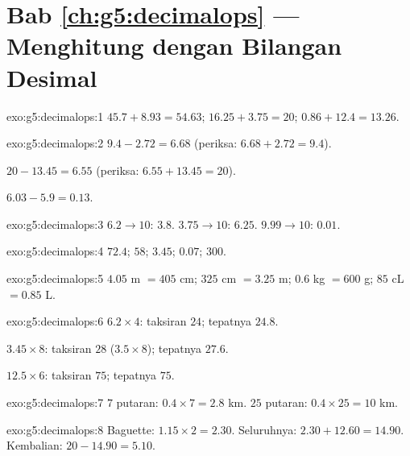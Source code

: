 \section*{Bab \ref{ch:g5:decimalops} --- Menghitung dengan Bilangan Desimal}

\begin{solution}{exo:g5:decimalops:1}
$45.7 + 8.93 = 54.63$; \quad
$16.25 + 3.75 = 20$; \quad
$0.86 + 12.4 = 13.26$.
\end{solution}

\begin{solution}{exo:g5:decimalops:2}
$9.4 - 2.72 = 6.68$ (periksa: $6.68 + 2.72 = 9.4$).

$20 - 13.45 = 6.55$ (periksa: $6.55 + 13.45 = 20$).

$6.03 - 5.9 = 0.13$.
\end{solution}

\begin{solution}{exo:g5:decimalops:3}
$6.2 \to 10$: $3.8$. \quad $3.75 \to 10$: $6.25$. \quad
$9.99 \to 10$: $0.01$.
\end{solution}

\begin{solution}{exo:g5:decimalops:4}
$72.4$; \quad $58$; \quad $3.45$; \quad $0.07$; \quad $300$.
\end{solution}

\begin{solution}{exo:g5:decimalops:5}
$4.05$ m $= 405$ cm; \quad $325$ cm $= 3.25$ m; \quad
$0.6$ kg $= 600$ g; \quad $85$ cL $= 0.85$ L.
\end{solution}

\begin{solution}{exo:g5:decimalops:6}
$6.2 \times 4$: taksiran $24$; tepatnya $24.8$.

$3.45 \times 8$: taksiran $28$ ($3.5 \times 8$); tepatnya $27.6$.

$12.5 \times 6$: taksiran $75$; tepatnya $75$.
\end{solution}

\begin{solution}{exo:g5:decimalops:7}
$7$ putaran: $0.4 \times 7 = 2.8$ km. $25$ putaran:
$0.4 \times 25 = 10$ km.
\end{solution}

\begin{solution}{exo:g5:decimalops:8}
Baguette: $1.15 \times 2 = 2.30$. Seluruhnya: $2.30 + 12.60 = 14.90$.
Kembalian: $20 - 14.90 = 5.10$.
\end{solution}

